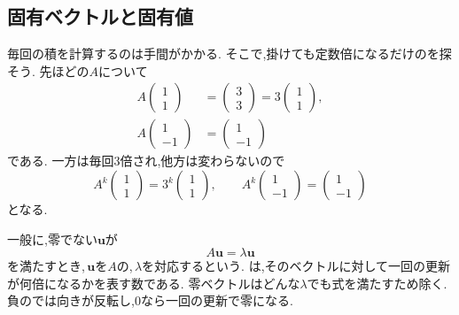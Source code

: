 \subsection{固有ベクトルと固有値}

毎回の積を計算するのは手間がかかる.
そこで,掛けても定数倍になるだけのを探そう.
先ほどの$A$について
\[
  \begin{aligned}
    A\begin{pmatrix}1\\1\end{pmatrix}
      &=\begin{pmatrix}3\\3\end{pmatrix}
       =3\begin{pmatrix}1\\1\end{pmatrix},\\
    A\begin{pmatrix}1\\-1\end{pmatrix}
      &=\begin{pmatrix}1\\-1\end{pmatrix}
  \end{aligned}
\]
である.
一方は毎回$3$倍され,他方は変わらないので
\[
  A^k\begin{pmatrix}1\\1\end{pmatrix}
    =3^k\begin{pmatrix}1\\1\end{pmatrix},
  \qquad
  A^k\begin{pmatrix}1\\-1\end{pmatrix}
    =\begin{pmatrix}1\\-1\end{pmatrix}
\]
となる.

一般に,零でない$\boldsymbol{u}$が
\[
  A\boldsymbol{u}=\lambda\boldsymbol{u}
\]
を満たすとき,\,$\boldsymbol{u}$を$A$の\textbf{},\,$\lambda$を対応する\textbf{}という.
は,そのベクトルに対して一回の更新が何倍になるかを表す数である.
零ベクトルはどんな$\lambda$でも式を満たすため除く.負のでは向きが反転し,$0$なら一回の更新で零になる.

